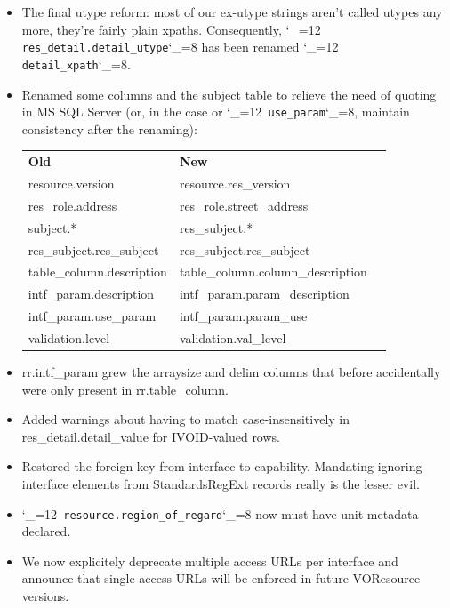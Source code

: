 \documentclass[11pt,a4paper]{ivoa}
\makeatletter
\def\rtent#1{\texttt{\color{rtcolor}\verb|#1|}}
\def\makeunderscoreletter{\catcode`\_=12}
\def\makeunderscoresubscript{\catcode`\_=8}
\def\rtent{\makeunderscoreletter\relax\rt@nt}
\def\rt@nt#1{\texttt{\color{rtcolor} #1}\makeunderscoresubscript{}}
\makeatother
\begin{document}
\begin{itemize}

\item The final utype reform: most of our ex-utype strings aren't called utypes
  any more, they're fairly plain xpaths.  Consequently,
  \rtent{res_detail.detail_utype} has been renamed
  \rtent{detail_xpath}.{}

\item Renamed some columns and the subject table to relieve the need of quoting
  in MS SQL Server (or, in the case or \rtent{use_param}, maintain
  consistency after the renaming):\\

\begin{tabular}{lll}

\textbf{Old}&
\textbf{New}\\
resource.version&resource.res\_version\\
res\_role.address&res\_role.street\_address\\
subject.*&res\_subject.*\\
res\_subject.res\_subject&res\_subject.res\_subject\\
table\_column.description&table\_column.column\_description\\
intf\_param.description&intf\_param.param\_description\\
intf\_param.use\_param&intf\_param.param\_use\\
validation.level&validation.val\_level\\

\end{tabular}

\item rr.intf\_param grew the arraysize and delim columns that before
    accidentally were only present in rr.table\_column.{}

\item Added warnings about having to match case-insensitively in
  res\_detail.detail\_value for IVOID-valued rows.{}

\item Restored the foreign key from interface to capability.  Mandating
  ignoring interface elements from StandardsRegExt records really is the
  lesser evil.{}

\item \rtent{resource.region_of_regard} now must have unit metadata
  declared.{}

\item We now explicitely deprecate multiple access URLs per interface
  and announce that single access URLs will be enforced in future
  VOResource versions.{}

\end{itemize}
\end{document}
